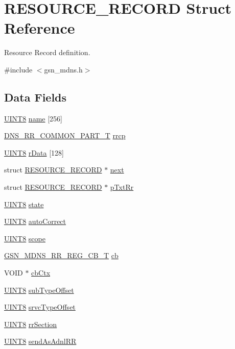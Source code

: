 \hypertarget{a00457}{
\section{RESOURCE\_\-RECORD Struct Reference}
\label{a00457}
}


Resource Record definition.  




{\ttfamily \#include $<$gsn\_\-mdns.h$>$}

\subsection*{Data Fields}
\begin{DoxyCompactItemize}
\item 
\hyperlink{a00660_gab27e9918b538ce9d8ca692479b375b6a}{UINT8} \hyperlink{a00457_a3f1ddd1a1bd4e4f28e75041bfe9a480c}{name} \mbox{[}256\mbox{]}
\item 
\hyperlink{a00015}{DNS\_\-RR\_\-COMMON\_\-PART\_\-T} \hyperlink{a00457_a2d95b266f79e4a5bc30d739e0e0a2d80}{rrcp}
\item 
\hyperlink{a00660_gab27e9918b538ce9d8ca692479b375b6a}{UINT8} \hyperlink{a00457_a81be43ad7df64a2c6a5d4ab8a7b9d395}{rData} \mbox{[}128\mbox{]}
\item 
struct \hyperlink{a00457}{RESOURCE\_\-RECORD} $\ast$ \hyperlink{a00457_a6c92670be2b64f157da77fd6fdaa10cd}{next}
\item 
struct \hyperlink{a00457}{RESOURCE\_\-RECORD} $\ast$ \hyperlink{a00457_a9e8e74a6a032325019d2ed0fd3601618}{pTxtRr}
\item 
\hyperlink{a00660_gab27e9918b538ce9d8ca692479b375b6a}{UINT8} \hyperlink{a00457_a6e9c4cbd32a1178b12f3a61f6855c896}{state}
\item 
\hyperlink{a00660_gab27e9918b538ce9d8ca692479b375b6a}{UINT8} \hyperlink{a00457_a6922e2bbd8ef32a53abd5bbf5e2b40a1}{autoCorrect}
\item 
\hyperlink{a00660_gab27e9918b538ce9d8ca692479b375b6a}{UINT8} \hyperlink{a00457_aa73cc4a6cdd8178cc27ecbdd515c750c}{scope}
\item 
\hyperlink{a00668_ga9c52fae5548745f14ef4e76fb05c2526}{GSN\_\-MDNS\_\-RR\_\-REG\_\-CB\_\-T} \hyperlink{a00457_a9537e3f5198ad7dff4aeecabdc552166}{cb}
\item 
VOID $\ast$ \hyperlink{a00457_abc1717c5357c7dda5c2abef096a06f1f}{cbCtx}
\item 
\hyperlink{a00660_gab27e9918b538ce9d8ca692479b375b6a}{UINT8} \hyperlink{a00457_aca5f18fef926c93c584fd96703207162}{subTypeOffset}
\item 
\hyperlink{a00660_gab27e9918b538ce9d8ca692479b375b6a}{UINT8} \hyperlink{a00457_a3f962f77c0abfaa0e61a70b72f6df844}{srvcTypeOffset}
\item 
\hyperlink{a00660_gab27e9918b538ce9d8ca692479b375b6a}{UINT8} \hyperlink{a00457_ae146e21a8c302dfab8bd9abeea5c22c8}{rrSection}
\item 
\hyperlink{a00660_gab27e9918b538ce9d8ca692479b375b6a}{UINT8} \hyperlink{a00457_a2059497fe249a99ce47098b51abd9e04}{sendAsAdnlRR}
\end{DoxyCompactItemize}



